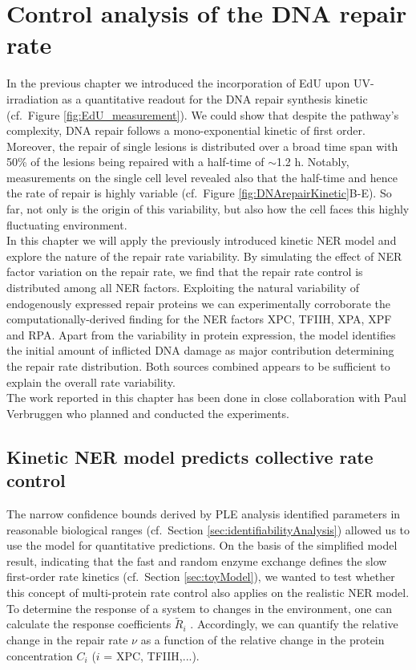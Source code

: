 \chapter{Control analysis of the DNA repair rate}
\label{chap:robustRepair}

In the previous chapter we introduced the incorporation of EdU upon UV-irradiation as a quantitative readout for the DNA repair synthesis kinetic (cf.\ Figure \ref{fig:EdU_measurement}). We could show that despite the pathway's complexity, DNA repair follows a mono-exponential kinetic of first order. Moreover, the repair of single lesions is distributed over a broad time span with 50\% of the lesions being repaired with a half-time of $\sim$1.2 h. Notably, measurements on the single cell level revealed also that the half-time and hence the rate of repair is highly variable (cf.\ Figure \ref{fig:DNArepairKinetic}B-E). So far, not only is the origin of this variability, but also how the cell faces this highly fluctuating environment.\\  
In this chapter we will apply the previously introduced kinetic NER model and explore the nature of the repair rate variability. By simulating the effect of NER factor variation on the repair rate, we find that the repair rate control is distributed among all NER factors. Exploiting the natural variability of endogenously expressed repair proteins we can experimentally corroborate the computationally-derived finding for the NER factors XPC, TFIIH, XPA, XPF and RPA. Apart from the variability in protein expression, the model identifies the initial amount of inflicted DNA damage as major contribution determining the repair rate distribution. Both sources combined appears to be sufficient to explain the overall rate variability.\\     

The work reported in this chapter has been done in close collaboration with Paul Verbruggen who planned and conducted the experiments.

\section{Kinetic NER model predicts collective rate control}
\label{sec:repairControl}

The narrow confidence bounds derived by PLE analysis identified parameters in reasonable biological ranges (cf.\ Section \ref{sec:identifiabilityAnalysis}) allowed us to use the model for quantitative predictions. On the basis of the simplified model result, indicating that the fast and random enzyme exchange defines the slow first-order rate kinetics (cf.\ Section \ref{sec:toyModel}), we wanted to test whether this concept of multi-protein rate control also applies on the realistic NER model. To determine the response of a system to changes in the environment, one can calculate the response coefficients $\tilde{R}_i$ \cite{Hofmeyr1991,Fell1992}. Accordingly, we can quantify the relative change in the repair rate $\nu$ as a function of the relative change in the protein concentration $C_i$ ($i$ = XPC, TFIIH,...).

